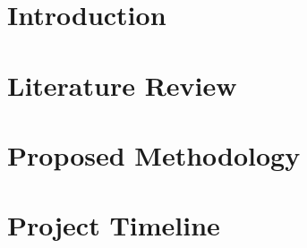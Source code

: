 \documentclass[12pt]{article}
\begin{document}


\newpage


\newpage
\tableofcontents

\newpage
\listoffigures

\newpage
\listoftables

\newpage

\section{Introduction}


\section{Literature Review}


\section{Proposed Methodology}


\section{Project Timeline}


\newpage


\end{document}
